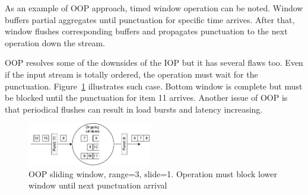As an example of OOP approach, timed window operation can be noted. Window buffers partial aggregates until punctuation for specific time arrives. After that, window flushes corresponding buffers and propagates punctuation to the next operation down the stream.

OOP resolves some of the downsides of the IOP but it has several flaws too. Even if the input stream is totally ordered, the operation must wait for the punctuation. Figure~\ref{oop} illustrates such case. Bottom window is complete but must be blocked until the punctuation for item 11 arrives. Another issue of OOP is that periodical flushes can result in load bursts and latency increasing. 

\begin{figure}[htbp]
  \centering
  \includegraphics[width=0.48\textwidth]{pics/oop}
  \caption{OOP sliding window, range=3, slide=1. Operation must block lower window until next punctuation arrival }
  \label {oop}
\end{figure}
